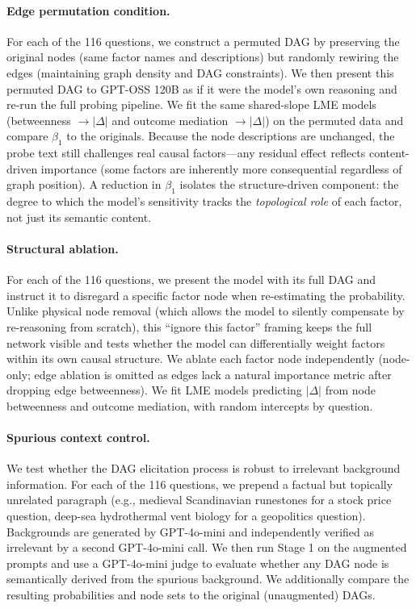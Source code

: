 \documentclass[11pt]{article}
\begin{document}
\paragraph{Edge permutation condition.} For each of the 116 questions, we construct a permuted DAG by preserving the original nodes (same factor names and descriptions) but randomly rewiring the edges (maintaining graph density and DAG constraints). We then present this permuted DAG to GPT-OSS 120B as if it were the model's own reasoning and re-run the full probing pipeline. We fit the same shared-slope LME models (betweenness $\rightarrow |\Delta|$ and outcome mediation $\rightarrow |\Delta|$) on the permuted data and compare $\beta_1$ to the originals. Because the node descriptions are unchanged, the probe text still challenges real causal factors---any residual effect reflects content-driven importance (some factors are inherently more consequential regardless of graph position). A reduction in $\beta_1$ isolates the structure-driven component: the degree to which the model's sensitivity tracks the \emph{topological role} of each factor, not just its semantic content.

\paragraph{Structural ablation.} For each of the 116 questions, we present the model with its full DAG and instruct it to disregard a specific factor node when re-estimating the probability. Unlike physical node removal (which allows the model to silently compensate by re-reasoning from scratch), this ``ignore this factor'' framing keeps the full network visible and tests whether the model can differentially weight factors within its own causal structure. We ablate each factor node independently (node-only; edge ablation is omitted as edges lack a natural importance metric after dropping edge betweenness). We fit LME models predicting $|\Delta|$ from node betweenness and outcome mediation, with random intercepts by question.

\paragraph{Spurious context control.} We test whether the DAG elicitation process is robust to irrelevant background information. For each of the 116 questions, we prepend a factual but topically unrelated paragraph (e.g., medieval Scandinavian runestones for a stock price question, deep-sea hydrothermal vent biology for a geopolitics question). Backgrounds are generated by GPT-4o-mini and independently verified as irrelevant by a second GPT-4o-mini call. We then run Stage 1 on the augmented prompts and use a GPT-4o-mini judge to evaluate whether any DAG node is semantically derived from the spurious background. We additionally compare the resulting probabilities and node sets to the original (unaugmented) DAGs.
\end{document}
